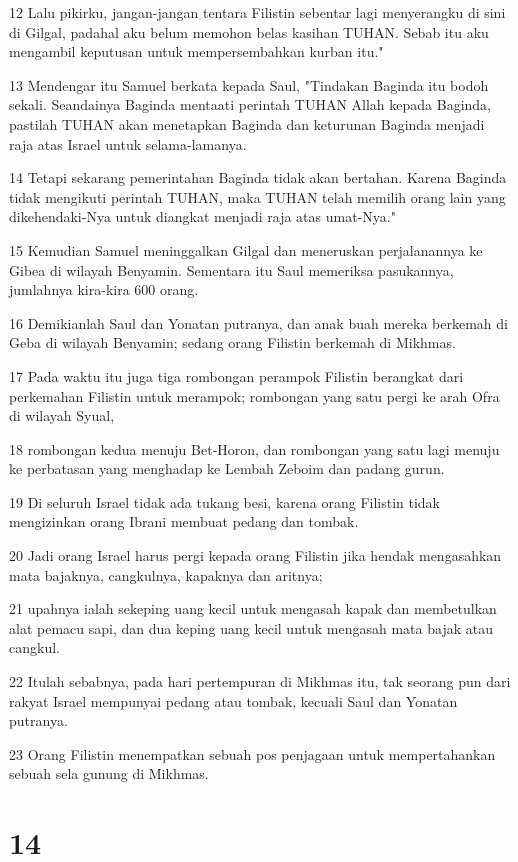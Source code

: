 \par 12 Lalu pikirku, jangan-jangan tentara Filistin sebentar lagi menyerangku di sini di Gilgal, padahal aku belum memohon belas kasihan TUHAN. Sebab itu aku mengambil keputusan untuk mempersembahkan kurban itu."
\par 13 Mendengar itu Samuel berkata kepada Saul, "Tindakan Baginda itu bodoh sekali. Seandainya Baginda mentaati perintah TUHAN Allah kepada Baginda, pastilah TUHAN akan menetapkan Baginda dan keturunan Baginda menjadi raja atas Israel untuk selama-lamanya.
\par 14 Tetapi sekarang pemerintahan Baginda tidak akan bertahan. Karena Baginda tidak mengikuti perintah TUHAN, maka TUHAN telah memilih orang lain yang dikehendaki-Nya untuk diangkat menjadi raja atas umat-Nya."
\par 15 Kemudian Samuel meninggalkan Gilgal dan meneruskan perjalanannya ke Gibea di wilayah Benyamin. Sementara itu Saul memeriksa pasukannya, jumlahnya kira-kira 600 orang.
\par 16 Demikianlah Saul dan Yonatan putranya, dan anak buah mereka berkemah di Geba di wilayah Benyamin; sedang orang Filistin berkemah di Mikhmas.
\par 17 Pada waktu itu juga tiga rombongan perampok Filistin berangkat dari perkemahan Filistin untuk merampok; rombongan yang satu pergi ke arah Ofra di wilayah Syual,
\par 18 rombongan kedua menuju Bet-Horon, dan rombongan yang satu lagi menuju ke perbatasan yang menghadap ke Lembah Zeboim dan padang gurun.
\par 19 Di seluruh Israel tidak ada tukang besi, karena orang Filistin tidak mengizinkan orang Ibrani membuat pedang dan tombak.
\par 20 Jadi orang Israel harus pergi kepada orang Filistin jika hendak mengasahkan mata bajaknya, cangkulnya, kapaknya dan aritnya;
\par 21 upahnya ialah sekeping uang kecil untuk mengasah kapak dan membetulkan alat pemacu sapi, dan dua keping uang kecil untuk mengasah mata bajak atau cangkul.
\par 22 Itulah sebabnya, pada hari pertempuran di Mikhmas itu, tak seorang pun dari rakyat Israel mempunyai pedang atau tombak, kecuali Saul dan Yonatan putranya.
\par 23 Orang Filistin menempatkan sebuah pos penjagaan untuk mempertahankan sebuah sela gunung di Mikhmas.

\chapter{14}

